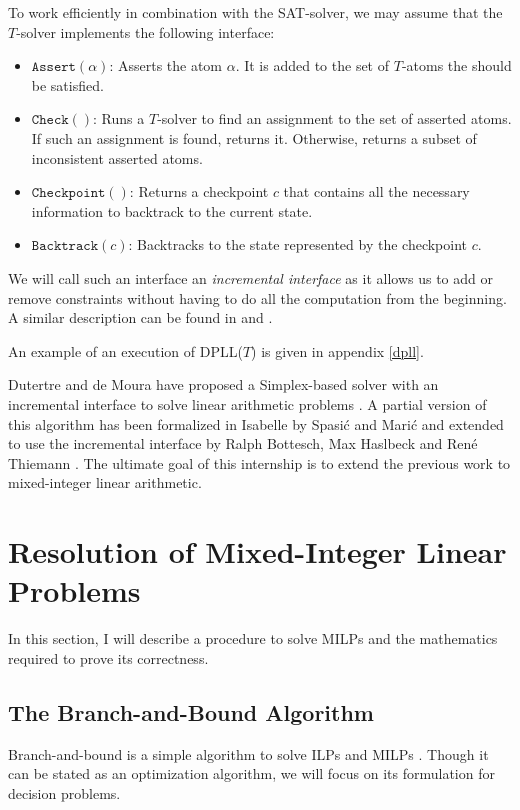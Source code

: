 \documentclass{article}
\newcommand{\iassert}[1]{\mathtt{Assert}(#1)}
\newcommand{\icheck}{\mathtt{Check}()}
\newcommand{\icheckpoint}{\mathtt{Checkpoint}()}
\newcommand{\ibacktrack}[1]{\mathtt{Backtrack}(#1)}
\begin{document}
To work efficiently in combination with the SAT-solver, we may assume that the
$T$-solver implements the following interface:
\begin{itemize}
  \item $\iassert{\alpha}$: Asserts the atom $\alpha$. It is added to the set of
    $T$-atoms the should be satisfied.
  \item $\icheck$: Runs a $T$-solver to find an assignment to the set of
    asserted atoms. If such an assignment is found, returns it. Otherwise,
    returns a subset of inconsistent asserted atoms.
  \item $\icheckpoint$: Returns a checkpoint $c$ that contains all the necessary
    information to backtrack to the current state.
  \item $\ibacktrack{c}$: Backtracks to the state represented by the checkpoint
    $c$.
\end{itemize}

We will call such an interface an \textit{incremental interface} as it allows us
to add or remove constraints without having to do all the computation from the
beginning. A similar description can be found in \cite{Dutertre2006} and
\cite{Thiemann2018,BHT2019}.

An example of an execution of DPLL($T$) is given in appendix \ref{dpll}.

Dutertre and de Moura have proposed a Simplex-based solver with an incremental
interface to solve linear arithmetic problems
\cite{Dutertre2006}. A partial version of this algorithm has been
formalized in Isabelle by Spasić and Marić \cite{Spasic2012} and extended to
use the incremental interface by Ralph Bottesch, Max Haslbeck and René Thiemann
\cite{Thiemann2018,BHT2019}. The ultimate goal of this internship is to extend
the previous work to mixed-integer linear arithmetic.

\section{Resolution of Mixed-Integer Linear Problems}
In this section, I will describe a procedure to solve MILPs and the
mathematics required to prove its correctness.

\subsection{The Branch-and-Bound Algorithm}
\label{bbdescr}
Branch-and-bound is a simple algorithm to solve ILPs and MILPs
\cite[Section 5.3]{Decision2016}. Though it can
be stated as an optimization algorithm, we will focus on its formulation for
decision problems.
\end{document}
